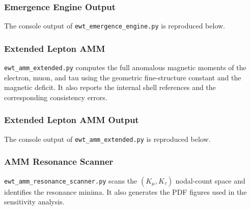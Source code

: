 \documentclass[10pt,a4paper]{article}
\begin{document}


\subsubsection{Emergence Engine Output}
\label{app:ewt_emergence_engine_output}

The console output of \texttt{ewt\_emergence\_engine.py} is reproduced below.



\subsubsection{Extended Lepton AMM}
\label{app:ewt_amm_extended}

\texttt{ewt\_amm\_extended.py} computes the full anomalous magnetic moments of the electron, muon, and tau using the geometric fine-structure constant and the magnetic deficit. It also reports the internal shell references and the corresponding consistency errors.



\subsubsection{Extended Lepton AMM Output}
\label{app:ewt_amm_extended_output}

The console output of \texttt{ewt\_amm\_extended.py} is reproduced below.



\subsubsection{AMM Resonance Scanner}
\label{app:ewt_amm_resonance_scanner}

\texttt{ewt\_amm\_resonance\_scanner.py} scans the \((K_\mu,K_\tau)\) nodal-count space and identifies the resonance minima. It also generates the PDF figures used in the sensitivity analysis.
\end{document}
